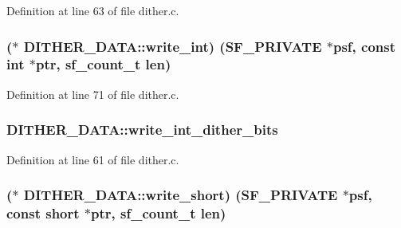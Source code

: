 Definition at line 63 of file dither.\+c.

\subsubsection[{\texorpdfstring{write\+\_\+int}{write_int}}]{($\ast$ D\+I\+T\+H\+E\+R\+\_\+\+D\+A\+T\+A\+::write\+\_\+int) ({\bf S\+F\+\_\+\+P\+R\+I\+V\+A\+TE} $\ast$psf, {\bf const} {\bf int} $\ast$ptr, {\bf sf\+\_\+count\+\_\+t} {\bf len})}\hypertarget{struct_d_i_t_h_e_r___d_a_t_a_a93172329517560f6e604fafa9f60b590}{}\label{struct_d_i_t_h_e_r___d_a_t_a_a93172329517560f6e604fafa9f60b590}


Definition at line 71 of file dither.\+c.

\subsubsection[{\texorpdfstring{write\+\_\+int\+\_\+dither\+\_\+bits}{write_int_dither_bits}}]{ D\+I\+T\+H\+E\+R\+\_\+\+D\+A\+T\+A\+::write\+\_\+int\+\_\+dither\+\_\+bits}\hypertarget{struct_d_i_t_h_e_r___d_a_t_a_ae34656d0373066b9249ce398d1033c58}{}\label{struct_d_i_t_h_e_r___d_a_t_a_ae34656d0373066b9249ce398d1033c58}


Definition at line 61 of file dither.\+c.

\subsubsection[{\texorpdfstring{write\+\_\+short}{write_short}}]{($\ast$ D\+I\+T\+H\+E\+R\+\_\+\+D\+A\+T\+A\+::write\+\_\+short) ({\bf S\+F\+\_\+\+P\+R\+I\+V\+A\+TE} $\ast$psf, {\bf const} short $\ast$ptr, {\bf sf\+\_\+count\+\_\+t} {\bf len})}\hypertarget{struct_d_i_t_h_e_r___d_a_t_a_a6735edbe77de2080bf57319bc3e46a65}{}\label{struct_d_i_t_h_e_r___d_a_t_a_a6735edbe77de2080bf57319bc3e46a65}


